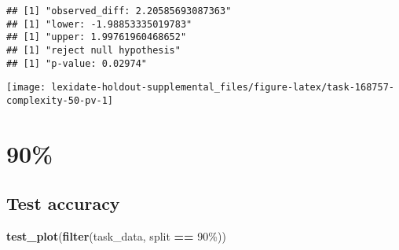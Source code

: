 \documentclass[
]{book}
\newenvironment{Shaded}{\begin{snugshade}}{\end{snugshade}}
\newcommand{\AttributeTok}[1]{\textcolor[rgb]{0.13,0.29,0.53}{#1}}
\newcommand{\DecValTok}[1]{\textcolor[rgb]{0.00,0.00,0.81}{#1}}
\newcommand{\FunctionTok}[1]{\textcolor[rgb]{0.13,0.29,0.53}{\textbf{#1}}}
\newcommand{\NormalTok}[1]{#1}
\newcommand{\OtherTok}[1]{\textcolor[rgb]{0.56,0.35,0.01}{#1}}
\newcommand{\SpecialCharTok}[1]{\textcolor[rgb]{0.81,0.36,0.00}{\textbf{#1}}}
\newcommand{\StringTok}[1]{\textcolor[rgb]{0.31,0.60,0.02}{#1}}
\begin{document}
\begin{Shaded}
\end{Shaded}

\begin{verbatim}
## [1] "observed_diff: 2.20585693087363"
## [1] "lower: -1.98853335019783"
## [1] "upper: 1.99761960468652"
## [1] "reject null hypothesis"
## [1] "p-value: 0.02974"
\end{verbatim}

\texttt{[image: lexidate-holdout-supplemental\_files/figure-latex/task-168757-complexity-50-pv-1]}

\hypertarget{section-23}{%
\section{90\%}\label{section-23}}

\hypertarget{test-accuracy-23}{%
\subsection{Test accuracy}\label{test-accuracy-23}}

\begin{Shaded}
\begin{Highlighting}[]
\FunctionTok{test\_plot}\NormalTok{(}\FunctionTok{filter}\NormalTok{(task\_data, split }\SpecialCharTok{==} \StringTok{\textquotesingle{}90\%\textquotesingle{}}\NormalTok{))}
\end{Highlighting}
\end{Shaded}
\end{document}
